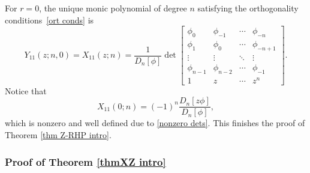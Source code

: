 \documentclass[pdftex]{sigma}
\numberwithin{equation}{section}
\begin{document}
For $r=0$, the unique monic polynomial of degree $n$ satisfying the orthogonality conditions~\eqref{ort conds} is%
	\begin{equation}\label{X11}
		Y_{11}(z;n,0)=X_{11}(z;n) = \frac{1}{D_n[\phi]} \det \begin{bmatrix}
			\phi_0 & \phi_{-1} & \cdots & \phi_{-n} \\
			\phi_1 & \phi_{0} & \cdots & \phi_{-n+1} \\
			\vdots & \vdots & \ddots & \vdots \\
			\phi_{n-1} & \phi_{n-2} & \cdots & \phi_{-1} \\
			1 & z & \cdots & z^n
		\end{bmatrix}.
	\end{equation}
	Notice that
	\begin{equation*}
		X_{11}(0;n) = (-1)^n\frac{D_n[z\phi]}{D_n[\phi]},
	\end{equation*}
	which is nonzero and well defined due to \eqref{nonzero dets}. This finishes the proof of Theorem \ref{thm Z-RHP intro}.

\subsubsection{Proof of Theorem \ref{thmXZ intro}}\label{sec proof of thm 1.8}
	
\end{document}
